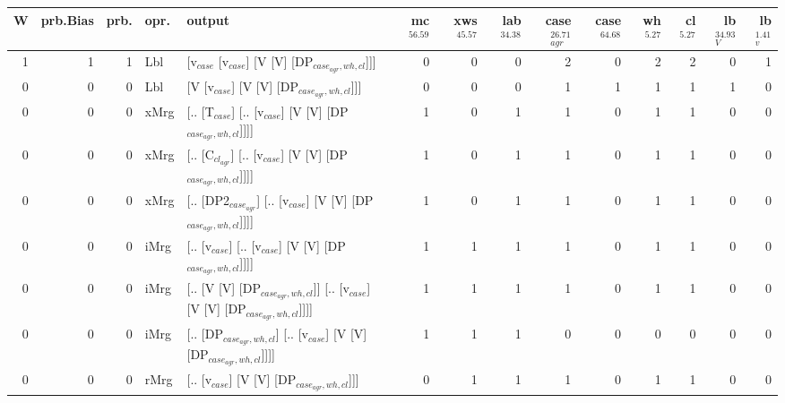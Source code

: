 \begin{tabularx}{\linewidth}{rrrlXrrrrrrrrr}
\hline
   W &   prb.Bias &   prb. & opr.   & output                                                                     &   mc$^{56.59}$ &   xws$^{45.57}$ &   lab$^{34.38}$ &   case$_{agr}^{26.71}$ &   case$^{64.68}$ &   wh$^{5.27}$ &   cl$^{5.27}$ &   lb$_{V}^{34.93}$ &   lb$_{v}^{1.41}$ \\
\hline
   1 &       1 &   1 & Lbl  & [v$_{case}$ [v$_{case}$] [V [V] [DP$_{case_{agr},wh,cl}$]]]                              &            0 &             0 &             0 &                  2 &              0 &           2 &           2 &              0 &             1 \\
   0 &       0 &   0 & Lbl  & [V [v$_{case}$] [V [V] [DP$_{case_{agr},wh,cl}$]]]                                   &            0 &             0 &             0 &                  1 &              1 &           1 &           1 &              1 &             0 \\
   0 &       0 &   0 & xMrg & [.. [T$_{case}$] [.. [v$_{case}$] [V [V] [DP$_{case_{agr},wh,cl}$]]]]                    &            1 &             0 &             1 &                  1 &              0 &           1 &           1 &              0 &             0 \\
   0 &       0 &   0 & xMrg & [.. [C$_{cl_{agr}}$] [.. [v$_{case}$] [V [V] [DP$_{case_{agr},wh,cl}$]]]]                  &            1 &             0 &             1 &                  1 &              0 &           1 &           1 &              0 &             0 \\
   0 &       0 &   0 & xMrg & [.. [DP2$_{case_{agr}}$] [.. [v$_{case}$] [V [V] [DP$_{case_{agr},wh,cl}$]]]]              &            1 &             0 &             1 &                  1 &              0 &           1 &           1 &              0 &             0 \\
   0 &       0 &   0 & iMrg & [.. [v$_{case}$] [.. [v$_{case}$] [V [V] [DP$_{case_{agr},wh,cl}$]]]]                    &            1 &             1 &             1 &                  1 &              0 &           1 &           1 &              0 &             0 \\
   0 &       0 &   0 & iMrg & [.. [V [V] [DP$_{case_{agr},wh,cl}$]] [.. [v$_{case}$] [V [V] [DP$_{case_{agr},wh,cl}$]]]] &            1 &             1 &             1 &                  1 &              0 &           1 &           1 &              0 &             0 \\
   0 &       0 &   0 & iMrg & [.. [DP$_{case_{agr},wh,cl}$] [.. [v$_{case}$] [V [V] [DP$_{case_{agr},wh,cl}$]]]]         &            1 &             1 &             1 &                  0 &              0 &           0 &           0 &              0 &             0 \\
   0 &       0 &   0 & rMrg & [.. [v$_{case}$] [V [V] [DP$_{case_{agr},wh,cl}$]]]                                  &            0 &             1 &             1 &                  1 &              0 &           1 &           1 &              0 &             0 \\
\hline
\end{tabularx}\endgroup\\
